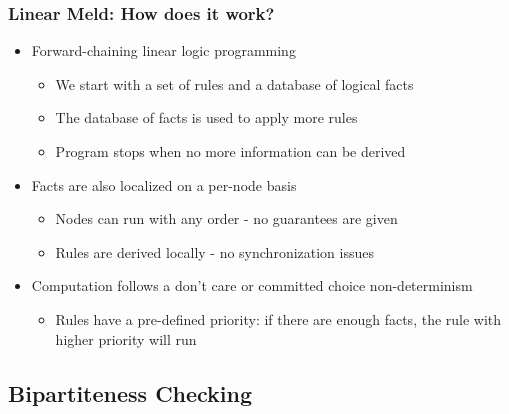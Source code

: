 \documentclass{beamer}
\begin{document}
\begin{frame}[fragile]
   \frametitle{Linear Meld: How does it work?}
   \begin{itemize}
      \item Forward-chaining linear logic programming
      \begin{itemize}
         \item We start with a set of rules and a database of logical facts
         \item The database of facts is used to apply more rules
         \item Program stops when no more information can be derived
      \end{itemize}
      \item Facts are also localized on a per-node basis
      \begin{itemize}
         \item Nodes can run with any order - no guarantees are given
         \item Rules are derived locally - no synchronization issues
      \end{itemize}
      \item Computation follows a don’t care or committed choice non-determinism
      \begin{itemize}
         \item Rules have a pre-defined priority: if there are enough facts, the rule with higher priority will run
      \end{itemize}
   \end{itemize}
\end{frame}

\subsection{Bipartiteness Checking}
\end{document}

